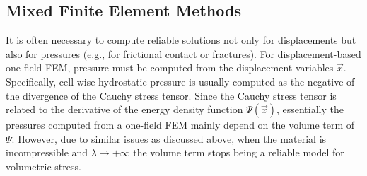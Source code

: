 


\subsection{Mixed Finite Element Methods}

It is often necessary to compute reliable solutions not only for displacements but also for
pressures (e.g., for frictional contact or fractures). For displacement-based one-field FEM,
pressure must be computed from the displacement variables $\vec{x}$. Specifically, cell-wise
hydrostatic pressure is usually computed as the negative of the divergence of the Cauchy stress
tensor. Since the Cauchy stress tensor is related to the derivative of the energy density function
$\Psi(\vec{x})$, essentially the pressures computed from a one-field FEM mainly depend on the volume
term of $\Psi$. However, due to similar issues as discussed above, when the material is
incompressible and $\lambda \rightarrow +\infty$ the volume term stops being a reliable model for
volumetric stress.

